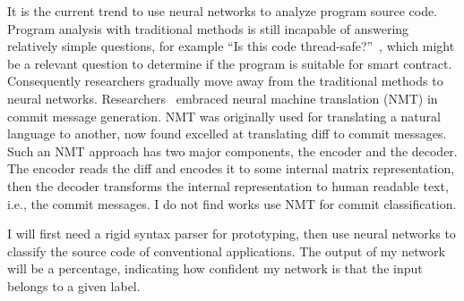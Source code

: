It is the current trend to use neural networks to analyze program source code.
Program analysis with traditional methods is still incapable of answering relatively simple questions, for example
 ``Is this code thread-safe?''~\cite{alexandru2017replicating},
which might be a relevant question to determine if the program is suitable for smart contract.
Consequently researchers gradually move away from the traditional methods to neural networks.
Researchers~\cite{xu2019commit,liu2019generating} embraced neural machine translation (NMT) in commit message generation.
NMT was originally used for translating a natural language to another, now found excelled at translating diff to commit messages.
Such an NMT approach has two major components, the encoder and the decoder.
The encoder reads the diff and encodes it to some internal matrix representation,
then the decoder transforms the internal representation to human readable text, i.e., the commit messages.
I do not find works use NMT for commit classification.


I will first need a rigid syntax parser for prototyping, then use neural networks to classify the source code of conventional applications.
The output of my network will be a percentage, indicating how confident my network is that the input belongs to a given label.



%
%
